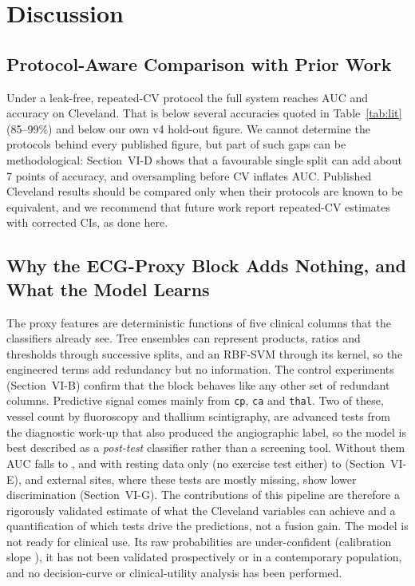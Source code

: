 \section{Discussion}
\subsection{Protocol-Aware Comparison with Prior Work}
Under a leak-free, repeated-CV protocol the full system reaches AUC \fullAUC{} and accuracy \fullAcc{} on Cleveland. That is below several accuracies quoted in Table~\ref{tab:lit} (85--99\%) and below our own v4 hold-out figure. We cannot determine the protocols behind every published figure, but part of such gaps can be methodological: Section~VI-D shows that a favourable single split can add about 7 points of accuracy, and oversampling before CV inflates AUC. Published Cleveland results should be compared only when their protocols are known to be equivalent, and we recommend that future work report repeated-CV estimates with corrected CIs, as done here.

\subsection{Why the ECG-Proxy Block Adds Nothing, and What the Model Learns}
The proxy features are deterministic functions of five clinical columns that the classifiers already see. Tree ensembles can represent products, ratios and thresholds through successive splits, and an RBF-SVM through its kernel, so the engineered terms add redundancy but no information. The control experiments (Section~VI-B) confirm that the block behaves like any other set of redundant columns. Predictive signal comes mainly from \texttt{cp}, \texttt{ca} and \texttt{thal}. Two of these, vessel count by fluoroscopy and thallium scintigraphy, are advanced tests from the diagnostic work-up that also produced the angiographic label, so the model is best described as a \emph{post-test} classifier rather than a screening tool. Without them AUC falls to \robNoAngioFu{}, and with resting data only (no exercise test either) to \robRestFu{} (Section~VI-E), and external sites, where these tests are mostly missing, show lower discrimination (Section~VI-G). The contributions of this pipeline are therefore a rigorously validated estimate of what the Cleveland variables can achieve and a quantification of which tests drive the predictions, not a fusion gain. The model is not ready for clinical use. Its raw probabilities are under-confident (calibration slope \calFull{}), it has not been validated prospectively or in a contemporary population, and no decision-curve or clinical-utility analysis has been performed.

